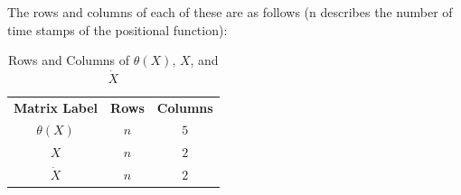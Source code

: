 \documentclass[11pt]{article}
\numberwithin{equation}{section}
\theoremstyle{plain}
\theoremstyle{definition}
\theoremstyle{remark}
\begin{document}
\noindent The rows and columns of each of these are as follows (n describes the number of time stamps of the positional function): 

\begin{table}[h]
    \centering
    \begin{tabular}{ccc}
    \textbf{Matrix Label} & \textbf{Rows} & \textbf{Columns} \\
        \textbf{$\theta(X)$} & $n$ & $5$\\
         \textbf{$X$}& $n$ & $2$ \\
         \textbf{$\dot{X}$} & $n$  & $2$ \\
    \end{tabular}
    \caption{Rows and Columns of $\theta(X)$, $X$, and $\dot{X}$}
    \label{fig 2: table of rows and columns}
\end{table}

\pagebreak
\end{document}
